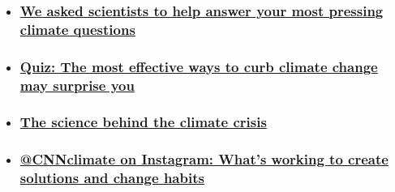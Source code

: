 \begin{itemize}
\item
  \hypertarget{we-asked-scientists-to-help-answer-your-most-pressing-climate-questions}{%
  \subsubsection{\texorpdfstring{\href{https://www.cnn.com/interactive/2019/09/world/climate-questions-answered/index.html}{We
  asked scientists to help answer your most pressing climate
  questions}}{We asked scientists to help answer your most pressing climate questions}}\label{we-asked-scientists-to-help-answer-your-most-pressing-climate-questions}}
\item
  \hypertarget{quiz-the-most-effective-ways-to-curb-climate-change-may-surprise-you}{%
  \subsubsection{\texorpdfstring{\href{https://www.cnn.com/interactive/2019/04/specials/climate-change-solutions-quiz/index.html}{Quiz:
  The most effective ways to curb climate change may surprise
  you}}{Quiz: The most effective ways to curb climate change may surprise you}}\label{quiz-the-most-effective-ways-to-curb-climate-change-may-surprise-you}}
\item
  \hypertarget{the-science-behind-the-climate-crisis}{%
  \subsubsection{\texorpdfstring{\href{/2019/09/04/us/climate-change-science-101-basics/index.html}{The
  science behind the climate
  crisis}}{The science behind the climate crisis}}\label{the-science-behind-the-climate-crisis}}
\item
  \hypertarget{cnnclimate-on-instagram-whats-working-to-create-solutions-and-change-habits}{%
  \subsubsection{\texorpdfstring{\href{https://www.instagram.com/cnnclimate/}{\textbf{@CNNclimate
  on Instagram:} What's working to create solutions and change
  habits}}{@CNNclimate on Instagram: What's working to create solutions and change habits}}\label{cnnclimate-on-instagram-whats-working-to-create-solutions-and-change-habits}}
\end{itemize}


